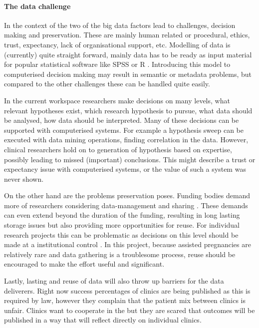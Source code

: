 \paragraph{The data challenge}
In the context of the \project{} two of the big data factors lead to challenges, decision making and preservation.
These are mainly human related or procedural, \eg{} ethics, trust, expectancy, lack of organisational support, etc.
Modelling of data is (currently) quite straight forward, mainly data has to be ready as input material for popular statistical software like SPSS \cite{spssSoftware} or R \cite{rSoftware}.
Introducing this model to computerised decision making may result in semantic or metadata problems, but compared to the other challenges these can be handled quite easily.

In the current workspace researchers make decisions on many levels, \eg{} what relevant hypotheses exist, which research hypothesis to pursue, what data should be analysed, how data should be interpreted.
Many of these decisions can be supported with computerised systems.
For example a hypothesis sweep can be executed with data mining operations, finding correlation in the data.
However, clinical researchers hold on to generation of hypothesis based on expertise, possibly leading to missed (important) conclusions.
This might describe a trust or expectancy issue with computerised systems, or the value of such a system was never shown.

On the other hand are the problems preservation poses.
Funding bodies demand more of researchers considering data-management and sharing \cite{dsb3lynch}.
These demands can even extend beyond the duration of the funding, resulting in long lasting storage issues but also providing more opportunities for reuse.
For individual research projects this can be problematic as decisions on this level should be made at a institutional control \cite{dsb3lynch}.
In this project, because assisted pregnancies are relatively rare and data gathering is a troublesome process, reuse should be encouraged to make the effort useful and significant.

Lastly, lasting and reuse of data will also throw up barriers for the data deliverers.
Right now success percentages of clinics are being published as this is required by law, however they complain that the patient mix between clinics is unfair.
Clinics want to cooperate in the \project{} but they are scared that outcomes will be published in a way that will reflect directly on individual clinics.

